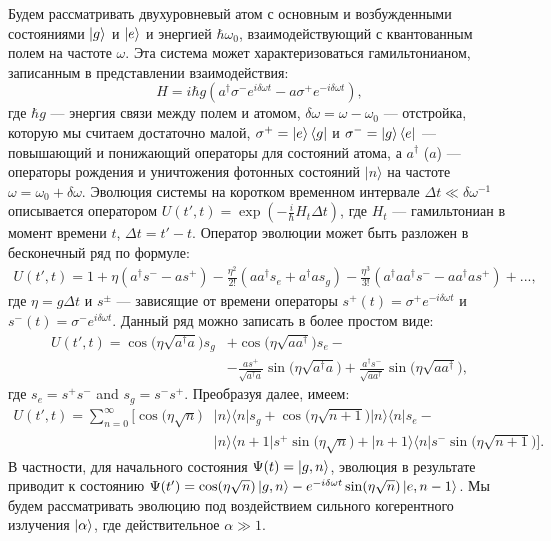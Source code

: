 Будем рассматривать двухуровневый атом с основным и возбужденными состояниями $\ket{g}$ и $\ket{e}$ и энергией $\hbar \omega_0$, взаимодействующий с квантованным полем на частоте $\omega$. Эта система может характеризоваться гамильтонианом, записанным в представлении взаимодействия:
\begin{equation}
	H = i\hbar g (a^\dag \sigma^-  e^{i\delta\omega t} - a \sigma^+  e^{-i\delta\omega t}),
	\label{Hqint}
\end{equation}
где $\hbar g$ --- энергия связи между полем и атомом, $\delta\omega = \omega - \omega_0$ --- отстройка, которую мы считаем достаточно малой, $\sigma^{+} = \ket{e}\bra{g}$ и $\sigma^{-} = \ket{g} \bra{e}$ --- повышающий и понижающий операторы для состояний атома, а $a^\dag$ ($a$) --- операторы рождения и уничтожения фотонных состояний $|n\rangle$  на частоте $\omega = \omega_0 + \delta\omega$. 
Эволюция системы на коротком временном интервале $\Delta t \ll \delta\omega^{-1}$ описывается оператором $U(t',t) = \exp(-\frac{i}{\hbar} H_t \Delta t)$, где $H_t$ --- гамильтониан в момент времени $t$, $\Delta t = t'-t$. Оператор эволюции может быть разложен в бесконечный ряд по формуле:
\begin{equation}
	\begin{split}
		U(t',t) = 1 + 
		\eta (a^\dag s^- - a s^+ ) 
		-\frac{\eta^2}{2!} (a a^{\dag} s_{e} + a^{\dag}a s_{g} ) -
		\frac{\eta^3}{3!} (a^{\dag} a a^\dag s^- - a a^{\dag}a s^+)+... ,
	\end{split}
	\label{ut}
\end{equation}
где $\eta = g\Delta t$ и $s^\pm$ --- зависящие от времени операторы $s^+(t) = \sigma^+ e^{-i\delta\omega t}$ и $s^-(t) = \sigma^- e^{i\delta\omega t}$. 
Данный ряд можно записать в более простом виде: 
\begin{equation}
	\begin{split}
	U(t',t) =  \cos{\big(\eta \sqrt{a^\dag a}\big)} s_g &+ \cos{\big(\eta \sqrt{a a^\dag}\big)} s_e - \\
	&- \frac{a s^+}{\sqrt{a^\dag a}} \sin{\big(\eta \sqrt{a^\dag a}\big)} + \frac{a^\dag s^-}{\sqrt{a a^\dag}} \sin{\big(\eta \sqrt{a a^\dag}\big)},
	\end{split}	
\end{equation}
где $s_e = s^+ s^-$ and $s_g = s^- s^+$. Преобразуя далее, имеем:
\begin{equation}
	\begin{split}
		U(t',t) = \sum_{n=0}^{\infty} \Big[  \cos{\big(\eta \sqrt{n}\big)} &|n\rangle\langle n| s_g + \cos{\big(\eta \sqrt{n+1}\big)} |n\rangle\langle n| s_e - \\ 
		&|n\rangle\langle n+1| s^+ \sin{\big(\eta \sqrt{n}\big)} + |n+1\rangle\langle n| s^- \sin{\big(\eta \sqrt{n+1}\big)} \Big].	
	\end{split}
	\label{ut}
\end{equation}
В частности, для начального состояния $\Psi(t) = \ket{g,n}$, эволюция в результате приводит к состоянию $\Psi(t')=\cos(\eta \sqrt{n}) \ket{g,n}-e^{-i\delta\omega t} \sin(\eta \sqrt{n}) \ket{e, n-1}$. Мы будем рассматривать эволюцию под воздействием сильного когерентного излучения  $\ket{\alpha}$, где действительное $\alpha \gg 1$.

